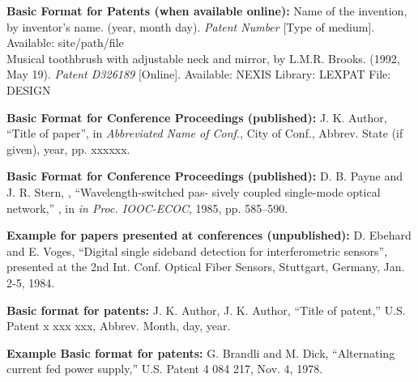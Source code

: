 \documentclass[journal]{IEEEtran}
\begin{document}
\begin{thebibliography}{1}
	 \textbf{Basic Format for Patents (when available online):} Name of the invention, by inventor’s name. (year, month day). \textit{Patent Number} [Type of medium]. Available: site/path/file\\
	
	 Musical toothbrush with adjustable neck and mirror, by L.M.R. Brooks. (1992, May 19). \textit{Patent D326189} [Online]. Available: NEXIS Library: LEXPAT File: DESIGN
	
	 \textbf{Basic Format for Conference Proceedings (published):} J. K. Author, “Title of paper”, in \textit{Abbreviated Name of Conf.}, City of Conf., Abbrev. State (if given), year, pp. xxxxxx.

	 \textbf{Basic Format for Conference Proceedings (published):} D. B. Payne and J. R. Stern, , “Wavelength-switched pas- sively coupled single-mode optical network,” , in \textit{in Proc. IOOC-ECOC}, 1985, pp. 585–590.

	 \textbf{Example for papers presented at conferences (unpublished):} 	D. Ebehard and E. Voges, “Digital single sideband detection for interferometric sensors”, presented at the 2nd Int. Conf. Optical Fiber Sensors, Stuttgart, Germany, Jan. 2-5, 1984.
	
	 \textbf{Basic format for patents:} J. K. Author, J. K. Author, “Title of patent,” U.S. Patent x xxx xxx, Abbrev. Month, day, year.

	 \textbf{Example Basic format for patents:} G. Brandli and M. Dick, “Alternating current fed power supply,” 
U.S. Patent 4 084 217, Nov. 4, 1978.


\end{thebibliography}
\end{document}
